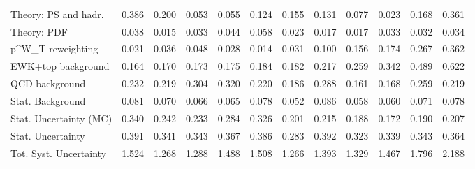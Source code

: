 \begin{tabular}{l|p{0.6cm}p{0.6cm}p{0.6cm}p{0.6cm}p{0.6cm}p{0.6cm}p{0.6cm}p{0.6cm}p{0.6cm}p{0.6cm}p{0.6cm}}
Theory: PS and hadr.                     & 0.386 & 0.200 & 0.053 & 0.055 & 0.124 & 0.155 & 0.131 & 0.077 & 0.023 & 0.168 & 0.361 \\
Theory: PDF                              & 0.038 & 0.015 & 0.033 & 0.044 & 0.058 & 0.023 & 0.017 & 0.017 & 0.033 & 0.032 & 0.034 \\
p^{W}_{T} reweighting                    & 0.021 & 0.036 & 0.048 & 0.028 & 0.014 & 0.031 & 0.100 & 0.156 & 0.174 & 0.267 & 0.362 \\
EWK+top background                       & 0.164 & 0.170 & 0.173 & 0.175 & 0.184 & 0.182 & 0.217 & 0.259 & 0.342 & 0.489 & 0.622 \\
QCD background                           & 0.232 & 0.219 & 0.304 & 0.320 & 0.220 & 0.186 & 0.288 & 0.161 & 0.168 & 0.259 & 0.219 \\
Stat. Background                         & 0.081 & 0.070 & 0.066 & 0.065 & 0.078 & 0.052 & 0.086 & 0.058 & 0.060 & 0.071 & 0.078 \\
Stat. Uncertainty (MC)                   & 0.340 & 0.242 & 0.233 & 0.284 & 0.326 & 0.201 & 0.215 & 0.188 & 0.172 & 0.190 & 0.207 \\
\hline
Stat. Uncertainty                        & 0.391 & 0.341 & 0.343 & 0.367 & 0.386 & 0.283 & 0.392 & 0.323 & 0.339 & 0.343 & 0.364 \\
\hline
Tot. Syst. Uncertainty                   & 1.524 & 1.268 & 1.288 & 1.488 & 1.508 & 1.266 & 1.393 & 1.329 & 1.467 & 1.796 & 2.188 \\
\hline
\end{tabular}
